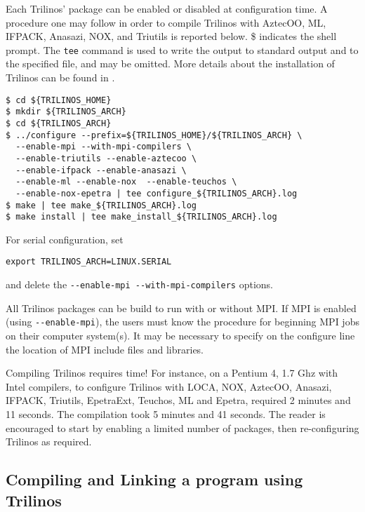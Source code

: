 \smallskip

Each Trilinos' package can be enabled or disabled at configuration time.
A procedure one may follow in order to compile Trilinos with AztecOO,
ML, IFPACK, Anasazi, NOX, and Triutils is reported below. \$ indicates the
shell prompt. The \verb!tee! command is used to write the output to
standard output and to the specified file, and may be omitted.  More
details about the installation of Trilinos can be found in
\cite{Trilinos-Users-Guide}.
\begin{verbatim}
$ cd ${TRILINOS_HOME}
$ mkdir ${TRILINOS_ARCH}
$ cd ${TRILINOS_ARCH}
$ ../configure --prefix=${TRILINOS_HOME}/${TRILINOS_ARCH} \
  --enable-mpi --with-mpi-compilers \
  --enable-triutils --enable-aztecoo \
  --enable-ifpack --enable-anasazi \
  --enable-ml --enable-nox  --enable-teuchos \
  --enable-nox-epetra | tee configure_${TRILINOS_ARCH}.log
$ make | tee make_${TRILINOS_ARCH}.log
$ make install | tee make_install_${TRILINOS_ARCH}.log
\end{verbatim}
For serial configuration, set
\begin{verbatim}
export TRILINOS_ARCH=LINUX.SERIAL
\end{verbatim}
and delete the \verb!--enable-mpi --with-mpi-compilers! options.
\begin{remark}
  All Trilinos packages can be build to run with or without MPI. If MPI
  is enabled (using \verb!--enable-mpi!), the users must know the
  procedure for beginning MPI jobs on their computer system(s). It may be
  necessary to specify on the configure line the location of MPI include
  files and libraries.
\end{remark}

\begin{remark}
  Compiling Trilinos requires time! For instance, on a Pentium 4, 1.7
  Ghz with Intel compilers, to configure Trilinos with LOCA, NOX,
  AztecOO, Anasazi, IFPACK, Triutils, EpetraExt, Teuchos, ML and Epetra,
  required 2 minutes and 11 seconds. The compilation took 5 minutes and
  41 seconds. The reader is encouraged to start by enabling a limited
  number of packages, then re-configuring Trilinos as required.
\end{remark}


\subsection{Compiling and Linking a program using Trilinos}
\label{sec:intro_compiling}

